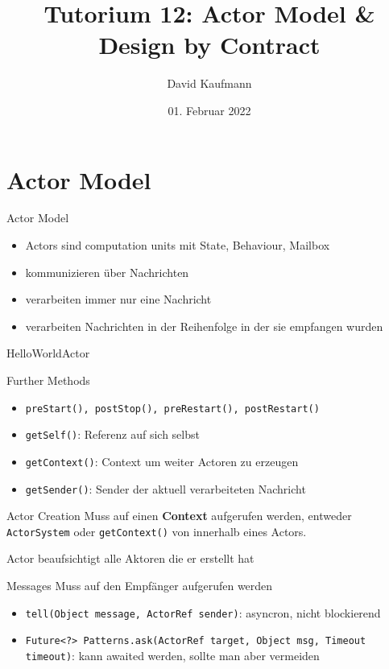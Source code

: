 \documentclass{beamer}
\title{Tutorium 12: Actor Model \& Design by Contract}
\author{David Kaufmann}
\institute{Tutorium Programmierparadigmen am KIT}
\date{01. Februar 2022}
\begin{document}
\begin{frame}
    \titlepage
\end{frame}

\section{Actor Model}
\begin{frame}{Actor Model}
    \begin{itemize}
        \item Actors sind computation units mit State, Behaviour, Mailbox
        \item kommunizieren über Nachrichten
        \item verarbeiten immer nur eine Nachricht
        \item verarbeiten Nachrichten in der Reihenfolge in der sie empfangen wurden
    \end{itemize}
\end{frame}

\begin{frame}{HelloWorldActor}
    \footnotesize
\end{frame}

\begin{frame}{Further Methods}
    \begin{itemize}
        \item \texttt{preStart(), postStop(), preRestart(), postRestart()}
        \item \texttt{getSelf()}: Referenz auf sich selbst
        \item \texttt{getContext()}: Context um weiter Actoren zu erzeugen
        \item \texttt{getSender()}: Sender der aktuell verarbeiteten Nachricht
    \end{itemize}
\end{frame}

\begin{frame}{Actor Creation}
    Muss auf einen \textbf{Context} aufgerufen werden, entweder \texttt{ActorSystem} oder \texttt{getContext()} von innerhalb eines Actors.
    
    Actor beaufsichtigt alle Aktoren die er erstellt hat
    \footnotesize
\end{frame}

\begin{frame}{Messages}
    Muss auf den Empfänger aufgerufen werden
    \begin{itemize}
        \item \texttt{tell(Object message, ActorRef sender)}: asyncron, nicht blockierend
        \item \texttt{Future<?> Patterns.ask(ActorRef target, Object msg, Timeout timeout)}: kann awaited werden, sollte man aber vermeiden
    \end{itemize}
\end{frame}
\end{document}
